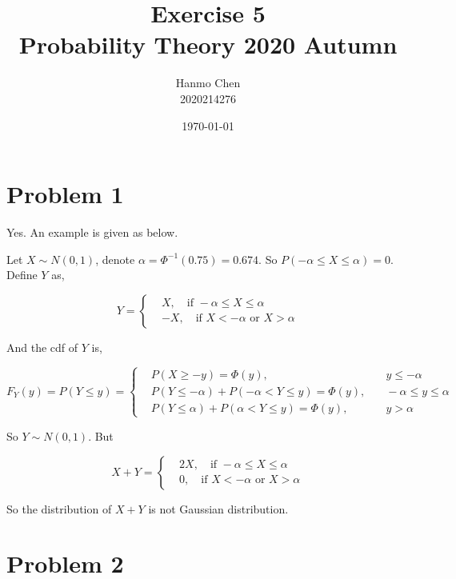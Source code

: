 \documentclass{article}
\title{Exercise 5 \\ Probability Theory 2020 Autumn}
\author{Hanmo Chen \\ 2020214276}
\date{\today}
\begin{document}
\maketitle

\section{Problem 1}

Yes. An example is given as below.

Let $X \sim N(0,1)$, denote $\alpha = \Phi^{-1}(0.75) = 0.674$. So $P(-\alpha \leqslant X \leqslant \alpha) = 0$. Define $Y$ as,

\begin{equation}
    Y = \left\{\begin{aligned}
        & X, \quad \text{if } -\alpha \leqslant X \leqslant \alpha \\
        & -X, \quad \text{if } X <-\alpha  \text{ or } X>\alpha
    \end{aligned}\right.
\end{equation}

And the cdf of $Y$ is,

\begin{equation}
    F_Y(y) = P(Y\leqslant y ) = \left\{\begin{aligned}
        & P(X\geqslant -y) = \Phi(y),&\quad  y\leqslant  - \alpha\\
        &  P(Y\leqslant - \alpha) + P(-\alpha < Y\leqslant  y) = \Phi(y), & \quad -\alpha \leqslant y \leqslant \alpha \\
        & P(Y\leqslant  \alpha) + P(\alpha < Y\leqslant  y) = \Phi(y),&\quad y > \alpha
    \end{aligned}\right.
\end{equation}

So $Y \sim N(0,1)$. But 

\begin{equation}
    X+Y = \left\{\begin{aligned}
        & 2X, \quad \text{if } -\alpha \leqslant X \leqslant \alpha \\
        & 0, \quad \text{if } X <-\alpha  \text{ or } X>\alpha
    \end{aligned}\right.
\end{equation}

So the distribution of $X + Y$ is not Gaussian distribution.

\section{Problem 2}
\end{document}

